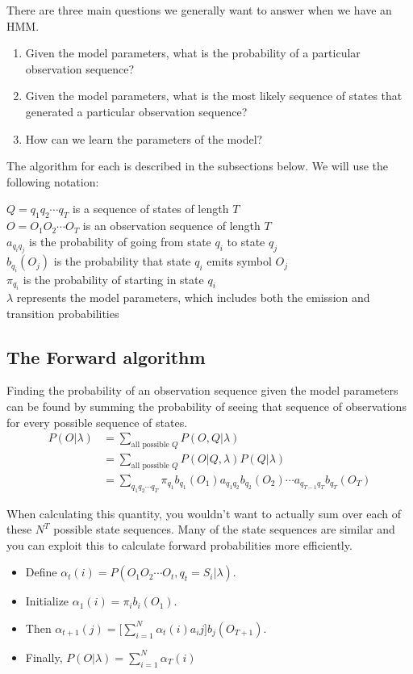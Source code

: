 \documentclass[11pt, oneside]{article}
\begin{document}
There are three main questions we generally want to answer when we have an HMM.

\begin{enumerate}
\item Given the model parameters, what is the probability of a particular observation sequence?
\item Given the model parameters, what is the most likely sequence of states that generated a particular observation sequence?
\item How can we learn the parameters of the model?
\end{enumerate}

The algorithm for each is described in the subsections below. We will use the following notation:

$Q = q_1q_2\cdots q_T$ is a sequence of states of length $T$\\
$O = O_1O_2\cdots O_T$ is an observation sequence of length $T$\\
$a_{q_iq_j}$ is the probability of going from state $q_i$ to state $q_j$\\
$b_{q_i}(O_j)$ is the probability that state $q_i$ emits symbol $O_j$\\
$\pi_{q_i}$ is the probability of starting in state $q_i$\\
$\lambda$ represents the model parameters, which includes both the emission and transition probabilities

\subsection{The Forward algorithm}

Finding the probability of an observation sequence given the model parameters can be found by summing the probability of seeing that sequence of observations for every possible sequence of states.
\begin{align*}
P(O|\lambda) &= \sum_{\textrm{all possible } Q} P(O,Q|\lambda)\\
&= \sum_{\textrm{all possible } Q} P(O|Q,\lambda)P(Q|\lambda)\\
&= \sum_{q_1q_2\cdots q_T}\pi_{q_1}b_{q_1}(O_1)a_{q_1q_2}b_{q_2}(O_2)\cdots 
a_{q_{T-1}q_T}b_{q_T}(O_T)
\end{align*}

When calculating this quantity, you wouldn't want to actually sum over each of these $N^T$ possible state sequences. Many of the state sequences are similar and you can exploit this to calculate forward probabilities more efficiently. 
\begin{itemize}
\item Define $\alpha_t(i) = P(O_1O_2\cdots O_t, q_t=S_i|\lambda)$.
\item Initialize $\alpha_1(i) = \pi_ib_i(O_1)$.
\item Then $\alpha_{t+1}(j) = \bigl[\sum_{i=1}^N \alpha_t(i)a_ij \bigr]b_j(O_{T+1})$.
\item Finally, $P(O|\lambda) = \sum_{i=1}^N\alpha_T(i)$
\end{itemize}
\end{document}
